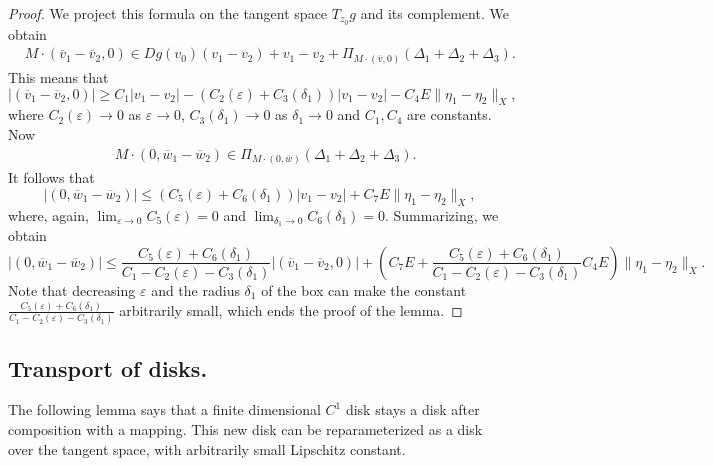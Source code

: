 \documentclass[11pt, leqno]{amsart}
\theoremstyle{definition}
\begin{document}
\begin{proof}
	 		 	We project this formula on the tangent space $T_{z_0}g$ and its complement. We obtain
	 		 	\begin{align*}
	 		 		& M\cdot  (\overline{v}_1-\overline{v}_2,0) \in  D g(v_0)(v_1-v_2)+v_1-v_2  + \Pi_{M\cdot  (\overline{v},0)}(\Delta_1+\Delta_2+\Delta_3).
	 		 	\end{align*}
	 		 	This means that
	 		 	$$
	 		 	|(\overline{v}_1-\overline{v}_2,0) | \geq C_1 |v_1-v_2| - (C_2(\varepsilon)+C_3(\delta_1))|v_1-v_2| - C_4E\|\eta_1-\eta_2\|_X,
	 		 	$$
	 		 	where $C_2(\varepsilon) \to 0$  as $\varepsilon\to 0$, $C_3(\delta_1)\to 0$ as $\delta_1 \to 0$ and $C_1, C_4$ are constants. Now
	 		 	\begin{align*}
	 		 		& M\cdot  (0,\overline{w}_1-\overline{w}_2) \in  \Pi_{M\cdot  (0,\overline{w})}(\Delta_1+\Delta_2+\Delta_3).
	 		 	\end{align*}
	 		 	It follows that
	 		 	$$
	 		 	|(0,\overline{w}_1-\overline{w}_2) |\leq (C_5(\varepsilon)+C_6(\delta_1))|v_1-v_2|+C_7E\|\eta_1-\eta_2\|_X,
	 		 	$$
	 		 	where, again, $\lim_{\varepsilon\to 0}C_5(\varepsilon) = 0$ and $\lim_{\delta_1\to 0}C_6(\delta_1) = 0$. Summarizing, we obtain
	 		 	$$
	 		 	|(0,\overline{w}_1-\overline{w}_2) |\leq \frac{C_5(\varepsilon)+C_6(\delta_1)}{C_1-C_2(\varepsilon)-C_3(\delta_1)}|(\overline{v}_1-\overline{v}_2,0) | + \left(C_7E+\frac{C_5(\varepsilon)+C_6(\delta_1)}{C_1-C_2(\varepsilon)-C_3(\delta_1)}C_4E\right)\|\eta_1-\eta_2\|_X.
	 		 	$$
	 		 	Note that decreasing $\varepsilon$ and the radius $\delta_1$ of the box can make the constant $\frac{C_5(\varepsilon)+C_6(\delta_1)}{C_1-C_2(\varepsilon)-C_3(\delta_1)}$ arbitrarily small, which ends the proof of the lemma.
	 		 	
	 		 	\end{proof} 
	 	\subsection{Transport of disks.} The following lemma says that a finite dimensional $C^1$ disk stays a disk after composition with a mapping. This new disk can be reparameterized as a disk over the tangent space, with arbitrarily small Lipschitz constant. 
	 	
\end{document}
